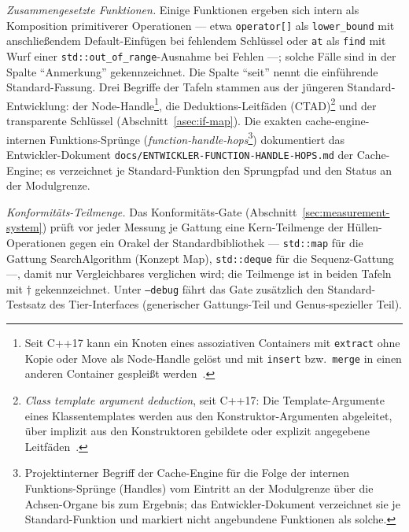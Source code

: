 \emph{Zusammengesetzte Funktionen.} Einige Funktionen ergeben sich intern als Komposition
primitiverer Operationen --- etwa \texttt{operator[]} als \texttt{lower\_bound} mit anschließendem
Default-Einfügen bei fehlendem Schlüssel oder \texttt{at} als \texttt{find} mit Wurf einer
\texttt{std::out\_of\_range}-Ausnahme bei Fehlen ---; solche Fälle sind in der Spalte \enquote{Anmerkung}
gekennzeichnet. Die Spalte \enquote{seit} nennt die einführende Standard-Fassung. Drei Begriffe der
Tafeln stammen aus der jüngeren Standard-Entwicklung: der Node-Handle\footnote{Seit C++17 kann ein
Knoten eines assoziativen Containers mit \texttt{extract} ohne Kopie oder Move als Node-Handle gelöst
und mit \texttt{insert} bzw.\ \texttt{merge} in einen anderen Container gespleißt
werden~\cite{talbot2016splicing}.}, die Deduktions-Leitfäden (CTAD)\footnote{\emph{Class template
argument deduction}, seit C++17: Die Template-Argumente eines Klassentemplates werden aus den
Konstruktor-Argumenten abgeleitet, über implizit aus den Konstruktoren gebildete oder explizit
angegebene Leitfäden~\cite{spertus2016ctad}.} und der transparente Schlüssel
(Abschnitt~\ref{asec:if-map}). Die exakten cache-engine-internen Funktions-Sprünge
(\emph{function-handle-hops}\footnote{Projektinterner Begriff der Cache-Engine für die Folge der internen
Funktions-Sprünge (Handles) vom Eintritt an der Modulgrenze über die Achsen-Organe bis zum Ergebnis;
das Entwickler-Dokument verzeichnet sie je Standard-Funktion und markiert nicht angebundene
Funktionen als solche.}) dokumentiert das Entwickler-Dokument
\texttt{docs/\allowbreak{}ENTWICKLER-\allowbreak{}FUNCTION-\allowbreak{}HANDLE-\allowbreak{}HOPS.md}
der Cache-Engine; es verzeichnet je Standard-Funktion den Sprungpfad und den Status an der
Modulgrenze.

\emph{Konformitäts-Teilmenge.} Das Konformitäts-Gate (Abschnitt~\ref{sec:measurement-system})
prüft vor jeder Messung je Gattung eine Kern-Teilmenge der Hüllen-Operationen gegen ein Orakel der
Standardbibliothek --- \texttt{std::map} für die Gattung SearchAlgorithm (Konzept Map),
\texttt{std::deque} für die Sequenz-Gattung ---, damit nur Vergleichbares verglichen wird; die Teilmenge
ist in beiden Tafeln mit $\dagger$ gekennzeichnet. Unter \texttt{--debug} fährt das Gate zusätzlich den
Standard-Testsatz des Tier-Interfaces (generischer Gattungs-Teil und Genus-spezieller Teil).

